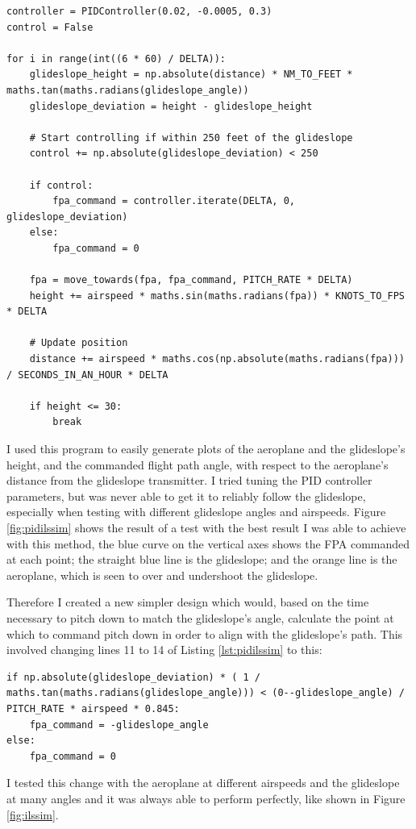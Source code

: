 \documentclass{article}
\begin{document}
\lstset{style=csharp, language=Python}
\begin{lstlisting}[label={lst:pidilssim}, caption=PID ILS Simulation test script]
controller = PIDController(0.02, -0.0005, 0.3)
control = False

for i in range(int((6 * 60) / DELTA)):
    glideslope_height = np.absolute(distance) * NM_TO_FEET * maths.tan(maths.radians(glideslope_angle))
    glideslope_deviation = height - glideslope_height

    # Start controlling if within 250 feet of the glideslope
    control += np.absolute(glideslope_deviation) < 250

    if control:
        fpa_command = controller.iterate(DELTA, 0, glideslope_deviation)
    else:
        fpa_command = 0

    fpa = move_towards(fpa, fpa_command, PITCH_RATE * DELTA)
    height += airspeed * maths.sin(maths.radians(fpa)) * KNOTS_TO_FPS * DELTA

    # Update position
    distance += airspeed * maths.cos(np.absolute(maths.radians(fpa))) / SECONDS_IN_AN_HOUR * DELTA

    if height <= 30:
        break
\end{lstlisting}
I used this program to easily generate plots of the aeroplane and the glideslope's height, and the commanded flight path angle, with respect to the aeroplane's distance from the glideslope transmitter.
I tried tuning the PID controller parameters, but was never able to get it to reliably follow the glideslope, especially when testing with different glideslope angles and airspeeds.
Figure \ref{fig:pidilssim} shows the result of a test with the best result I was able to achieve with this method, the blue curve on the vertical axes shows the FPA commanded at each point; the straight blue line is the glideslope; and the orange line is the aeroplane, which is seen to over and undershoot the glideslope.

Therefore I created a new simpler design which would, based on the time necessary to pitch down to match the glideslope's angle, calculate the point at which to command pitch down in order to align with the glideslope's path.
This involved changing lines 11 to 14 of Listing \ref{lst:pidilssim} to this:
\lstset{style=csharp, language=Python}
\begin{lstlisting}[label={lst:ilssim}, caption=ILS Simulation test script]
if np.absolute(glideslope_deviation) * ( 1 / maths.tan(maths.radians(glideslope_angle))) < (0--glideslope_angle) / PITCH_RATE * airspeed * 0.845:
    fpa_command = -glideslope_angle
else:
    fpa_command = 0
\end{lstlisting}
I tested this change with the aeroplane at different airspeeds and the glideslope at many angles and it was always able to perform perfectly, like shown in Figure \ref{fig:ilssim}.
\end{document}
